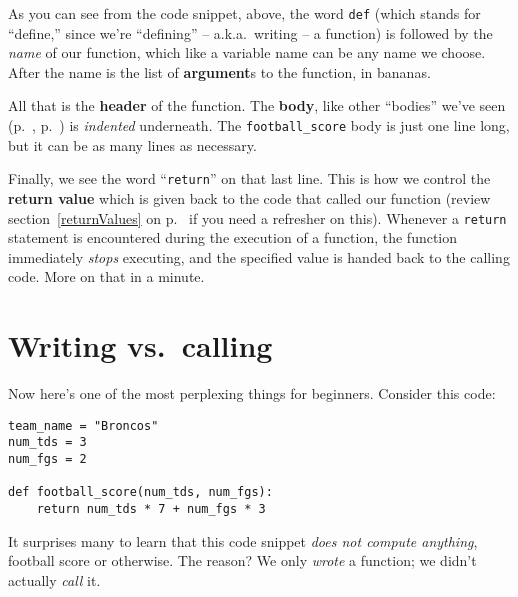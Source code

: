 
As you can see from the code snippet, above, the word \texttt{def} (which
stands for ``define,'' since we're ``defining'' -- a.k.a.~writing -- a
function) is followed by the \textit{name} of our function, which like a
variable name can be any name we choose. After the name is the list of
\textbf{argument}s to the function, in bananas.


All that is the \textbf{header} of the function. The \textbf{body}, like other
``bodies'' we've seen (p.~\pageref{loopBody}, p.~\pageref{ifBody}) is
\textit{indented} underneath. The \texttt{football\_score} body is just one
line long, but it can be as many lines as necessary.

\label{returnImmediatelyReturns}

Finally, we see the word ``\texttt{return}'' on that last line. This is how we
control the \textbf{return value} which is given back to the code that called
our function (review section~\ref{returnValues} on p.~\pageref{returnValues} if
you need a refresher on this). Whenever a \texttt{return} statement is
encountered during the execution of a function, the function immediately
\textit{stops} executing, and the specified value is handed back to the calling
code. More on that in a minute.

\section{Writing vs.~calling}

Now here's one of the most perplexing things for beginners. Consider this code:

\begin{Verbatim}[fontsize=\small,samepage=true,frame=single,framesep=3mm]
team_name = "Broncos"
num_tds = 3
num_fgs = 2

def football_score(num_tds, num_fgs):
    return num_tds * 7 + num_fgs * 3
\end{Verbatim}

It surprises many to learn that this code snippet \textit{does not compute
anything}, football score or otherwise. The reason? We only \textit{wrote} a
function; we didn't actually \textit{call} it.

